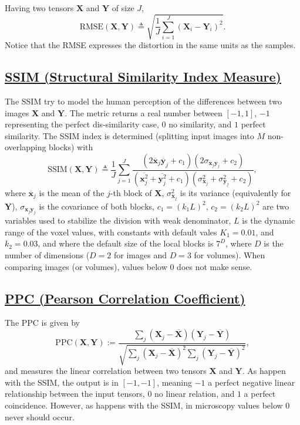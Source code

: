 \documentclass{article}
\begin{document}
Having two tensors $\mathbf{X}$ and $\mathbf{Y}$ of size $J$,
\begin{equation}
  \text{RMSE}(\mathbf{X},\mathbf{Y}) \triangleq \sqrt{\frac{1}{J}\sum_{i=1}^J(\mathbf{X}_i - \mathbf{Y}_i)^2}.
\end{equation}
Notice that the RMSE expresses the distortion in the same units as the
samples.

\subsection{\href{https://en.wikipedia.org/wiki/Structural_similarity_index_measure}{SSIM
    (Structural Similarity Index Measure)}}
The SSIM try to model the human perception of the differences between
two images $\mathbf{X}$ and $\mathbf{Y}$. The metric returns a real
number between $[-1, 1]$, $-1$ representing the perfect dis-similarity
case, $0$ no similarity, and $1$ perfect similarity. The SSIM index is
determined (splitting input images into $M$ non-overlapping blocks)
with
\begin{equation}
  \text{SSIM}(\mathbf{X}, \mathbf{Y}) \triangleq \frac{1}{J} \sum_{j=1}^J \frac{(2\overline{\mathbf{x}}_j \overline{\mathbf{y}}_j + c_1)(2\sigma_{\mathbf{x}_j \mathbf{y}_j} + c_2)}{(\overline{\mathbf{x}_j^2} + \overline{\mathbf{y}_j^2} + c_1)(\sigma^2_{\mathbf{x}_j} + \sigma^2_{\mathbf{y}_j} + c_2)},
\end{equation}
where $\overline{\mathbf x}_j$ is the mean of the $j$-th block of
$\mathbf{X}$, $\sigma^2_{\mathbf{x}_j}$ is its variance (equivalently
for $\mathbf{Y}$), $\sigma_{\mathbf{x}_j\mathbf{y}_j}$ is the
covariance of both blocks, $c_1=(k_1L)^2$, $c_2=(k_2L)^2$ are two
variables used to stabilize the division with weak denominator, $L$ is
the dynamic range of the voxel values, with constants with default
vales $K_1=0.01$, and $k_2=0.03$, and where the default size of the
local blocks is $7^D$, where $D$ is the number of dimensions ($D=2$
for images and $D=3$ for volumes). When comparing images (or volumes),
values below $0$ does not make sense.

\subsection{\href{https://en.wikipedia.org/wiki/Pearson_correlation_coefficient}{PPC
    (Pearson Correlation Coefficient)}}
The PPC is given
by
\begin{equation}
  \text{PPC}(\mathbf{X}, \mathbf{Y}) := \frac{\sum_j(\mathbf{X}_j - \overline{\mathbf{X}})(\mathbf{Y}_j - \overline{\mathbf{Y}})}{\sqrt{\sum_j (\mathbf{X}_j - \overline{\mathbf{X}})^2 \sum_j (\mathbf{Y}_j - \overline{\mathbf{Y}})^2}},
\end{equation}
and measures the linear correlation between two tensors $\mathbf{X}$
and $\mathbf{Y}$.  As happen with the SSIM, the output is in
$[-1, -1]$, meaning $-1$ a perfect negative linear relationship
between the input tensors, $0$ no linear relation, and $1$ a perfect
coincidence. However, as happens with the SSIM, in microscopy values
below $0$ never should occur.
\end{document}
